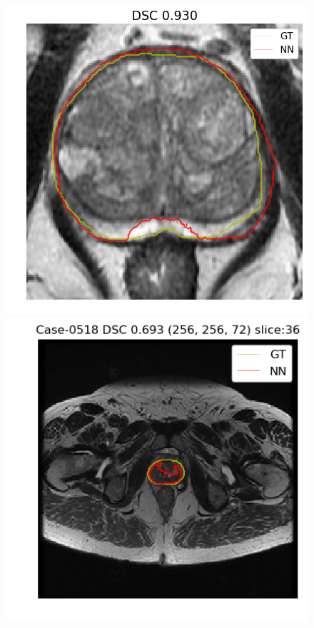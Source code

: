 \begin{figure}[h]
    \includegraphics[totalheight=.2\textheight]{imgs/results/Prostate_GE__GE_yes_ROI_MAX_Case-0537.png}
    \vspace{10mm}
    \includegraphics[totalheight=.2\textheight]{imgs/results/Prostate_GE__GE_yes_Original_MIN_Case-0518.png}

\end{figure}
